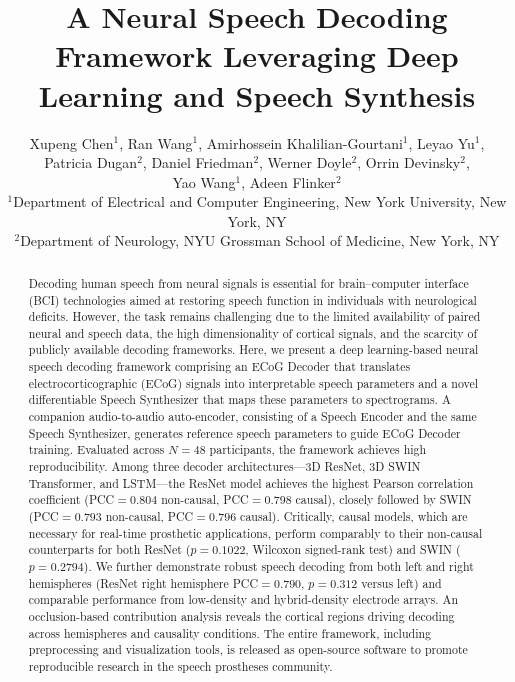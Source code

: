 \documentclass[11pt]{article}
\title{A Neural Speech Decoding Framework Leveraging Deep Learning and Speech Synthesis}
\author{
  Xupeng Chen$^{1}$, Ran Wang$^{1}$, Amirhossein Khalilian-Gourtani$^{1}$, Leyao Yu$^{1}$, \\
  Patricia Dugan$^{2}$, Daniel Friedman$^{2}$, Werner Doyle$^{2}$, Orrin Devinsky$^{2}$, \\
  Yao Wang$^{1}$, Adeen Flinker$^{2}$ \\[6pt]
  $^{1}$Department of Electrical and Computer Engineering, New York University, New York, NY \\
  $^{2}$Department of Neurology, NYU Grossman School of Medicine, New York, NY
}
\date{}
\begin{document}
\maketitle

\begin{abstract}
Decoding human speech from neural signals is essential for brain--computer interface (BCI) technologies aimed at restoring speech function in individuals with neurological deficits. However, the task remains challenging due to the limited availability of paired neural and speech data, the high dimensionality of cortical signals, and the scarcity of publicly available decoding frameworks. Here, we present a deep learning-based neural speech decoding framework comprising an ECoG Decoder that translates electrocorticographic (ECoG) signals into interpretable speech parameters and a novel differentiable Speech Synthesizer that maps these parameters to spectrograms. A companion audio-to-audio auto-encoder, consisting of a Speech Encoder and the same Speech Synthesizer, generates reference speech parameters to guide ECoG Decoder training. Evaluated across $N=48$ participants, the framework achieves high reproducibility. Among three decoder architectures---3D ResNet, 3D SWIN Transformer, and LSTM---the ResNet model achieves the highest Pearson correlation coefficient (PCC${}=0.804$ non-causal, PCC${}=0.798$ causal), closely followed by SWIN (PCC${}=0.793$ non-causal, PCC${}=0.796$ causal). Critically, causal models, which are necessary for real-time prosthetic applications, perform comparably to their non-causal counterparts for both ResNet ($p=0.1022$, Wilcoxon signed-rank test) and SWIN ($p=0.2794$). We further demonstrate robust speech decoding from both left and right hemispheres (ResNet right hemisphere PCC${}=0.790$, $p=0.312$ versus left) and comparable performance from low-density and hybrid-density electrode arrays. An occlusion-based contribution analysis reveals the cortical regions driving decoding across hemispheres and causality conditions. The entire framework, including preprocessing and visualization tools, is released as open-source software to promote reproducible research in the speech prostheses community.
\end{abstract}

\end{document}
